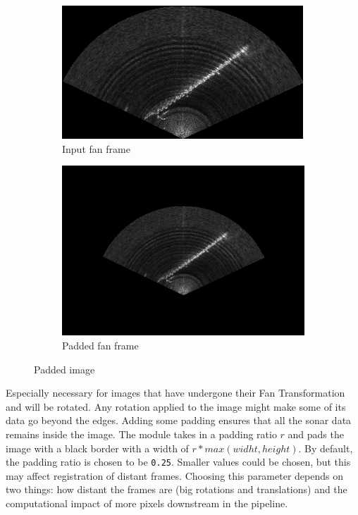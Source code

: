 \begin{figure}[H]
    \centering
    \begin{subfigure}[b]{.45\textwidth}
        \centering
        \includegraphics[width=\textwidth]{figures/pipeline/Fan.png}
        \caption{Input fan frame}
    \end{subfigure}
    \hfill
    \begin{subfigure}[b]{.45\textwidth}
        \centering
        \includegraphics[width=\textwidth]{figures/pipeline/Padding.png}
        \caption{Padded fan frame}
    \end{subfigure}
    \caption{Padded image}
    \label{fig:resizing}
\end{figure}

Especially necessary for images that have undergone their Fan Transformation and will be rotated. Any rotation applied to the image might make some of its data go beyond the edges. Adding some padding ensures that all the sonar data remains inside the image. The module takes in a padding ratio \(r\) and pads the image with a black border with a width of \(r * max(widht, height)\). By default, the padding ratio is chosen to be \texttt{0.25}. Smaller values could be chosen, but this may affect registration of distant frames. Choosing this parameter depends on two things: how distant the frames are (big rotations and translations) and the computational impact of more pixels downstream in the pipeline.

